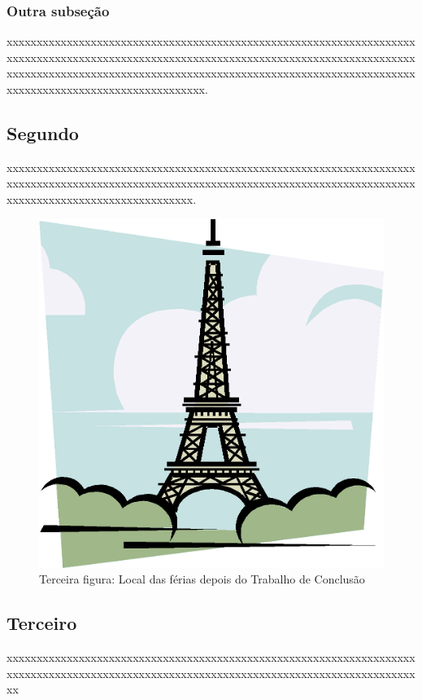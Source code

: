\subsubsection{Outra subseção}

xxxxxxxxxx\-xxxxxxxxxx\-xxxxxxxxxx\-xxxxxxxxxx\-xxxxxxxxxx\-xxxxxxxxxx\-xxxxxxxxxx\-xxxxxxxxxx\-xxxxxxxxxx\-xxxxxxxxxx\-xxxxxxxxxx\-xxxxxxxxxx\-xxxxxxxxxx\-xxxxxxxxxx\-xxxxxxxxxx\-xxxxxxxxxx\-xxxxxxxxxx\-xxxxxxxxxx\-xxxxxxxxxx\-xxxxxxxxxx\-xxxxxxxxxx\-xxxxxxxxxx\-xxxxxxxxxx\-xxxxxxx.

\subsection{Segundo}

xxxxxxxxxx\-xxxxxxxxxx\-xxxxxxxxxx\-xxxxxxxxxx\-xxxxxxxxxx\-xxxxxxxxxx\-xxxxxxxxxx\-xxxxxxxxxx\-xxxxxxxxxx\-xxxxxxxxxx\-xxxxxxxxxx\-xxxxxxxxxx\-xxxxxxxxxx\-xxxxxxxxxx\-xxxxxxxxxx\-xxxxxxxxxx\-xxxxxxx.

\begin{figure}[h]
    \centerline{\includegraphics{imagens/img-paris.png}}
    \caption{Terceira figura: Local das férias depois do Trabalho de Conclusão}
    \label{fig:paris}
\end{figure}

\subsection{Terceiro}

xxxxxxxxxx\-xxxxxxxxxx\-xxxxxxxxxx\-xxxxxxxxxx\-xxxxxxxxxx\-xxxxxxxxxx\-xxxxxxxxxx\-xxxxxxxxxx\-xxxxxxxxxx\-xxxxxxxxxx\-xxxxxxxxxx\-xxxxxxxxxx\-xxxxxxxxxx\-xxxxxxxx
